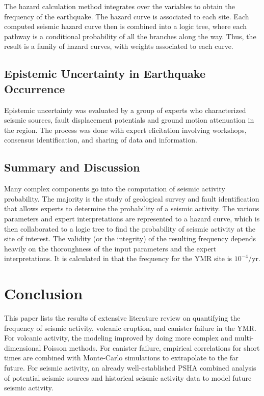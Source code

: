 \documentclass[12pt]{article}
\begin{document}
The hazard calculation method integrates over the variables
to obtain the frequency of the earthquake. The hazard curve
is associated to each site. Each computed seismic hazard curve then
is combined into a logic tree, where each pathway is a conditional
probability of all the branches along the way. Thus, the result
is a family of hazard curves, with weights associated to each curve.



\subsection{Epistemic Uncertainty in Earthquake Occurrence}

Epistemic uncertainty was evaluated by a group of experts
who characterized seismic sources, fault displacement potentials
and ground motion attenuation in the region. The process 
was done with expert elicitation involving workshops,
consensus identification, and sharing of data and information.


\subsection{Summary and Discussion}
Many complex components go into the computation of 
seismic activity probability. The majority is the study
of geological survey and fault identification that allows
experts to determine the probability of a seismic activity.
The various parameters and expert interpretations are 
represented to a hazard curve, which is then collaborated
to a logic tree to find the probability of seismic activity
at the site of interest.
The validity (or the integrity) of the resulting frequency 
depends heavily on the thoroughness of the input parameters
and the expert interpretations. It is calculated in \cite{stepp_probabilistic_2001}
that the frequency for the \gls{YMR} site is $10^{-4}$/yr.



\section{Conclusion}

This paper lists the results of extensive literature
review on quantifying the frequency of seismic activity,
volcanic eruption, and canister failure in the \gls{YMR}.
For volcanic activity, the modeling improved by doing more
complex and multi-dimensional Poisson methods. For canister
failure, empirical correlations for short times are combined
with Monte-Carlo simulations to extrapolate to the far future.
For seismic activity, an already well-established \gls{PSHA}
combined analysis of potential seismic sources and historical
seismic activity data to model future seismic activity.
\end{document}
